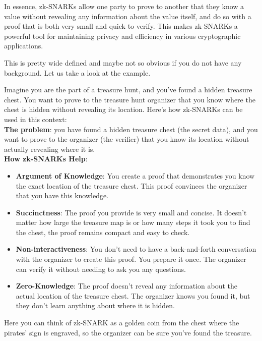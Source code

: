 \documentclass[../lecture-notes-148x210.tex]{subfiles}
\begin{document}
In essence, zk-SNARKs allow one party to prove to another that they know a value without revealing 
any information about the value itself, and do so with a proof that is both very small and quick to 
verify. This makes zk-SNARKs a powerful tool for maintaining privacy and efficiency in various 
cryptographic applications.

This is pretty wide defined and maybe not so obvious if you do not have any background. Let us take a
look at the example.

\begin{example}
    Imagine you are the part of a treasure hunt, and you've found a hidden treasure chest. You want to 
    prove to the treasure hunt organizer that you know where the chest is hidden without revealing
    its location. Here's how zk-SNARKs can be used in this context: \\

    \textbf{The problem}: you have found a hidden treasure chest (the secret data), and you want to
    prove to the organizer (the verifier) that you know its location without actually revealing 
    where it is. \\

    \textbf{How zk-SNARKs Help}:

    \begin{itemize}
        \item \textbf{Argument of Knowledge}: You create a proof that demonstrates you know the exact
        location of the treasure chest. This proof convinces the organizer that you have this 
        knowledge.
        \item \textbf{Succinctness}: The proof you provide is very small and concise. It doesn't matter how
        large the treasure map is or how many steps it took you to find the chest, the proof remains
        compact and easy to check.
        \item \textbf{Non-interactiveness}: You don't need to have a back-and-forth conversation with the 
        organizer to create this proof. You prepare it once. The organizer can verify it without 
        needing to ask you any questions.
        \item \textbf{Zero-Knowledge}: The proof doesn't reveal any information about the actual location of
        the treasure chest. The organizer knows you found it, but they don't learn anything about 
        where it is hidden. \\
    \end{itemize}

    Here you can think of zk-SNARK as a golden coin from the chest where the pirates' sign is 
    engraved, so the organizer can be sure you've found the treasure.
\end{example}
\end{document}
